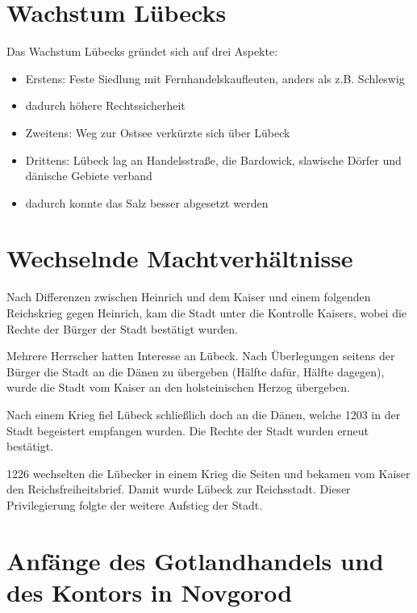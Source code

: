\documentclass[10pt,a4paper,oneside,ngerman,numbers=noenddot]{scrartcl}
\newenvironment{myitemize}{\begin{itemize}\itemsep -8pt}{\end{itemize}} %
\begin{document}
\section*{Wachstum Lübecks}

Das Wachstum Lübecks gründet sich auf drei Aspekte:

\begin{myitemize}
    \item Erstens: Feste Siedlung mit Fernhandelskaufleuten, anders als z.B. Schleswig
    \item dadurch höhere Rechtssicherheit
    \item Zweitens: Weg zur Ostsee verkürzte sich über Lübeck
    \item Drittens: Lübeck lag an Handelsstraße, die Bardowick, slawische Dörfer und dänische Gebiete verband
    \item dadurch konnte das Salz besser abgesetzt werden
\end{myitemize}

\section*{Wechselnde Machtverhältnisse}

Nach Differenzen zwischen Heinrich und dem Kaiser und einem folgenden Reichskrieg gegen Heinrich, kam
die Stadt unter die Kontrolle Kaisers, wobei die Rechte der Bürger der Stadt bestätigt wurden.

Mehrere Herrscher hatten Interesse an Lübeck. Nach Überlegungen seitens der Bürger die Stadt an die Dänen zu 
übergeben (Hälfte dafür, Hälfte dagegen), wurde die Stadt vom Kaiser an den holsteinischen Herzog
übergeben.

Nach einem Krieg fiel Lübeck schließlich doch an die Dänen, welche 1203 in der Stadt begeistert empfangen
wurden. Die Rechte der Stadt wurden erneut bestätigt.

1226 wechselten die Lübecker in einem Krieg die Seiten und bekamen vom Kaiser den Reichsfreiheitsbrief.
Damit wurde Lübeck zur Reichsstadt. Dieser Privilegierung folgte der weitere Aufstieg der Stadt.

\section*{Anfänge des Gotlandhandels und des Kontors in Novgorod}
\end{document}
